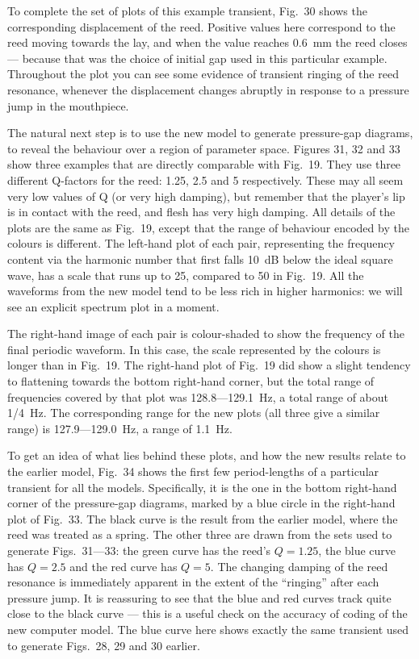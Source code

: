   To complete the set of plots of this example transient, Fig.\ 30 shows the 
  corresponding displacement of the reed. Positive values here correspond to 
  the reed moving towards the lay, and when the value reaches 0.6~mm the reed 
  closes — because that was the choice of initial gap used in this particular 
  example. Throughout the plot you can see some evidence of transient ringing 
  of the reed resonance, whenever the displacement changes abruptly in response 
  to a pressure jump in the mouthpiece. 

  The natural next step is to use the new model to generate pressure-gap 
  diagrams, to reveal the behaviour over a region of parameter space. Figures 
  31, 32 and 33 show three examples that are directly comparable with Fig.\ 19. 
  They use three different Q-factors for the reed: 1.25, 2.5 and 5 
  respectively. These may all seem very low values of Q (or very high damping), 
  but remember that the player's lip is in contact with the reed, and flesh has 
  very high damping. All details of the plots are the same as Fig.\ 19, except 
  that the range of behaviour encoded by the colours is different. The 
  left-hand plot of each pair, representing the frequency content via the 
  harmonic number that first falls 10~dB below the ideal square wave, has a 
  scale that runs up to 25, compared to 50 in Fig.\ 19. All the waveforms from 
  the new model tend to be less rich in higher harmonics: we will see an 
  explicit spectrum plot in a moment. 

  The right-hand image of each pair is colour-shaded to show the frequency of 
  the final periodic waveform. In this case, the scale represented by the 
  colours is longer than in Fig.\ 19. The right-hand plot of Fig.\ 19 did show 
  a slight tendency to flattening towards the bottom right-hand corner, but the 
  total range of frequencies covered by that plot was 128.8—129.1~Hz, a total 
  range of about 1/4~Hz. The corresponding range for the new plots (all three 
  give a similar range) is 127.9—129.0~Hz, a range of 1.1~Hz. 

  To get an idea of what lies behind these plots, and how the new results 
  relate to the earlier model, Fig.\ 34 shows the first few period-lengths of a 
  particular transient for all the models. Specifically, it is the one in the 
  bottom right-hand corner of the pressure-gap diagrams, marked by a blue 
  circle in the right-hand plot of Fig.\ 33. The black curve is the result from 
  the earlier model, where the reed was treated as a spring. The other three 
  are drawn from the sets used to generate Figs.\ 31—33: the green curve has 
  the reed’s $Q=1.25$, the blue curve has $Q=2.5$ and the red curve has $Q=5$. 
  The changing damping of the reed resonance is immediately apparent in the 
  extent of the “ringing” after each pressure jump. It is reassuring to see 
  that the blue and red curves track quite close to the black curve --- this is 
  a useful check on the accuracy of coding of the new computer model. The blue 
  curve here shows exactly the same transient used to generate Figs.\ 28, 29 
  and 30 earlier. 

